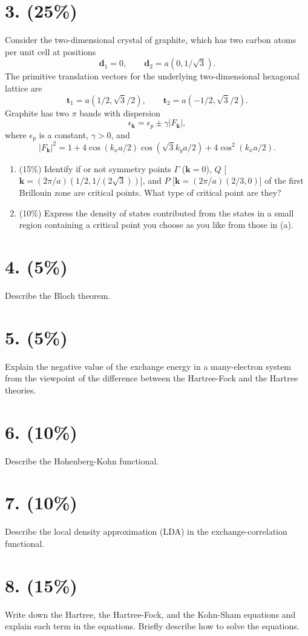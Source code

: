 \section*{3. (25\%)}
Consider the two-dimensional crystal of graphite, which has two carbon atoms per unit cell at positions
\[
\mathbf d_1=0,\qquad \mathbf d_2=a(0,1/\sqrt3).
\]
The primitive translation vectors for the underlying two-dimensional hexagonal lattice are
\[
\mathbf t_1=a(1/2,\sqrt3/2),\qquad
\mathbf t_2=a(-1/2,\sqrt3/2).
\]
Graphite has two $\pi$ bands with dispersion
\[
\epsilon_{\mathbf k}=\epsilon_p\pm\gamma|F_{\mathbf k}|,
\]
where $\epsilon_p$ is a constant, $\gamma>0$, and
\[
|F_{\mathbf k}|^2=1+4\cos(k_xa/2)\cos(\sqrt3k_ya/2)
                   +4\cos^2(k_xa/2).
\]
\begin{enumerate}[label=(\alph*)]
\item (15\%) Identify if or not symmetry points $\Gamma$ ($\mathbf k=0$), $Q$ [$\mathbf k=(2\pi/a)(1/2,1/(2\sqrt3))$], and $P$ [$\mathbf k=(2\pi/a)(2/3,0)$] of the first Brillouin zone are critical points. What type of critical point are they?
\item (10\%) Express the density of states contributed from the states in a small region containing a critical point you choose as you like from those in (a).
\end{enumerate}

\section*{4. (5\%)}
Describe the Bloch theorem.

\section*{5. (5\%)}
Explain the negative value of the exchange energy in a many-electron system from the viewpoint of the difference between the Hartree-Fock and the Hartree theories.

\section*{6. (10\%)}
Describe the Hohenberg-Kohn functional.

\section*{7. (10\%)}
Describe the local density approximation (LDA) in the exchange-correlation functional.

\section*{8. (15\%)}
Write down the Hartree, the Hartree-Fock, and the Kohn-Sham equations and explain each term in the equations. Briefly describe how to solve the equations.
